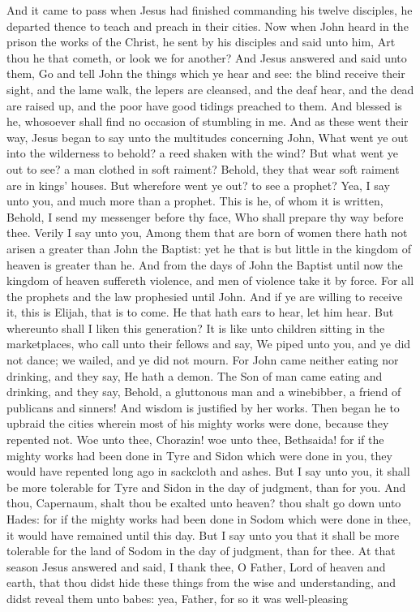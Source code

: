 And it came to pass when Jesus had finished commanding his twelve disciples, he departed thence to teach and preach in their cities.  Now when John heard in the prison the works of the Christ, he sent by his disciples and said unto him, Art thou he that cometh, or look we for another? And Jesus answered and said unto them, Go and tell John the things which ye hear and see: the blind receive their sight, and the lame walk, the lepers are cleansed, and the deaf hear, and the dead are raised up, and the poor have good tidings preached to them. And blessed is he, whosoever shall find no occasion of stumbling in me.  And as these went their way, Jesus began to say unto the multitudes concerning John, What went ye out into the wilderness to behold? a reed shaken with the wind? But what went ye out to see? a man clothed in soft raiment? Behold, they that wear soft raiment are in kings’ houses. But wherefore went ye out? to see a prophet? Yea, I say unto you, and much more than a prophet. This is he, of whom it is written, Behold, I send my messenger before thy face, Who shall prepare thy way before thee.  Verily I say unto you, Among them that are born of women there hath not arisen a greater than John the Baptist: yet he that is but little in the kingdom of heaven is greater than he. And from the days of John the Baptist until now the kingdom of heaven suffereth violence, and men of violence take it by force. For all the prophets and the law prophesied until John. And if ye are willing to receive it, this is Elijah, that is to come. He that hath ears to hear, let him hear. But whereunto shall I liken this generation? It is like unto children sitting in the marketplaces, who call unto their fellows and say, We piped unto you, and ye did not dance; we wailed, and ye did not mourn. For John came neither eating nor drinking, and they say, He hath a demon. The Son of man came eating and drinking, and they say, Behold, a gluttonous man and a winebibber, a friend of publicans and sinners! And wisdom is justified by her works.  Then began he to upbraid the cities wherein most of his mighty works were done, because they repented not. Woe unto thee, Chorazin! woe unto thee, Bethsaida! for if the mighty works had been done in Tyre and Sidon which were done in you, they would have repented long ago in sackcloth and ashes. But I say unto you, it shall be more tolerable for Tyre and Sidon in the day of judgment, than for you. And thou, Capernaum, shalt thou be exalted unto heaven? thou shalt go down unto Hades: for if the mighty works had been done in Sodom which were done in thee, it would have remained until this day. But I say unto you that it shall be more tolerable for the land of Sodom in the day of judgment, than for thee.  At that season Jesus answered and said, I thank thee, O Father, Lord of heaven and earth, that thou didst hide these things from the wise and understanding, and didst reveal them unto babes: yea, Father, for so it was well-pleasing 